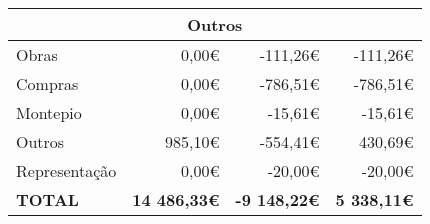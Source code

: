 \begin{longtable}{Xrrr}
\hline
\multicolumn{4}{c}{Outros} \\
\hline
Obras & 0,00€ & -111,26€ & -111,26€ \\
Compras & 0,00€ & -786,51€ & -786,51€ \\
Montepio & 0,00€ & -15,61€ & -15,61€ \\
Outros & 985,10€ & -554,41€ & 430,69€ \\
Representação & 0,00€ & -20,00€ & -20,00€ \\


\midrule \midrule

\bfseries TOTAL & \bfseries 14 486,33€ & \bfseries -9 148,22€ & \bfseries 5 338,11€ \\


\end{longtable}

